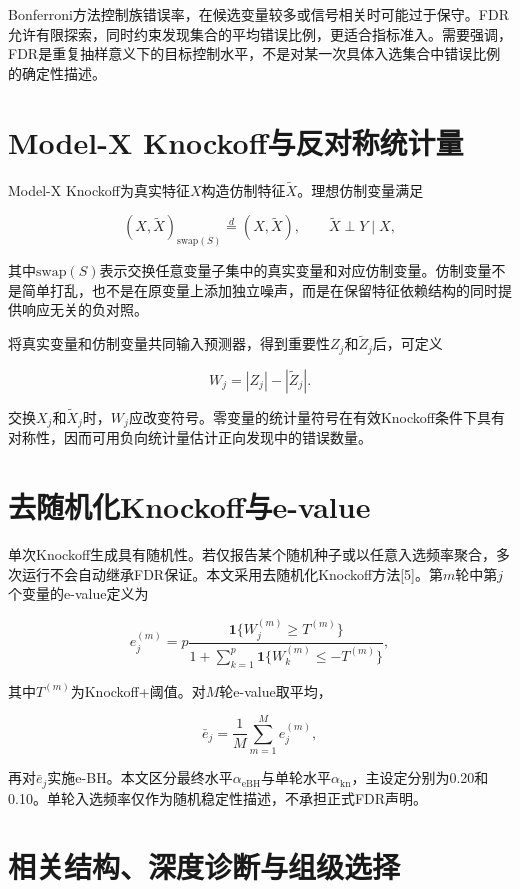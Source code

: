 \documentclass{sufethesismas}
\begin{document}
Bonferroni方法控制族错误率，在候选变量较多或信号相关时可能过于保守。FDR允许有限探索，同时约束发现集合的平均错误比例，更适合指标准入。需要强调，FDR是重复抽样意义下的目标控制水平，不是对某一次具体入选集合中错误比例的确定性描述。

\section{Model-X Knockoff与反对称统计量}

Model-X Knockoff为真实特征\(X\)构造仿制特征\(\widetilde X\)。理想仿制变量满足

\[
(X,\widetilde X)_{\mathrm{swap}(S)}
\overset{d}{=}(X,\widetilde X),\qquad
\widetilde X\perp Y\mid X,
\]

其中\(\mathrm{swap}(S)\)表示交换任意变量子集中的真实变量和对应仿制变量。仿制变量不是简单打乱，也不是在原变量上添加独立噪声，而是在保留特征依赖结构的同时提供响应无关的负对照。

将真实变量和仿制变量共同输入预测器，得到重要性\(Z_j\)和\(\widetilde Z_j\)后，可定义

\[
W_j=|Z_j|-|\widetilde Z_j|.
\]

交换\(X_j\)和\(\widetilde X_j\)时，\(W_j\)应改变符号。零变量的统计量符号在有效Knockoff条件下具有对称性，因而可用负向统计量估计正向发现中的错误数量。

\section{去随机化Knockoff与e-value}

单次Knockoff生成具有随机性。若仅报告某个随机种子或以任意入选频率聚合，多次运行不会自动继承FDR保证。本文采用去随机化Knockoff方法{[}5{]}。第\(m\)轮中第\(j\)个变量的e-value定义为

\[
e_j^{(m)}
=p\frac{\mathbf{1}\{W_j^{(m)}\ge T^{(m)}\}}
{1+\sum_{k=1}^{p}\mathbf{1}\{W_k^{(m)}\le -T^{(m)}\}},
\]

其中\(T^{(m)}\)为Knockoff+阈值。对\(M\)轮e-value取平均，

\[
\bar e_j=\frac{1}{M}\sum_{m=1}^{M}e_j^{(m)},
\]

再对\(\bar e_j\)实施e-BH。本文区分最终水平\(\alpha_{\mathrm{eBH}}\)与单轮水平\(\alpha_{\mathrm{kn}}\)，主设定分别为0.20和0.10。单轮入选频率仅作为随机稳定性描述，不承担正式FDR声明。

\section{相关结构、深度诊断与组级选择}
\end{document}
